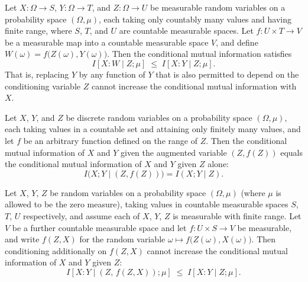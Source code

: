 \begin{theorem}
\label{ProbabilityTheory.condMutualInfo_comp_right_le_of_comp_conditioning}
\leanok
{}
Let $X\colon\Omega\to S$, $Y\colon\Omega\to T$, and $Z\colon\Omega\to U$ be measurable
random variables on a probability space $(\Omega,\mu)$, each taking only countably many
values and having finite range, where $S$, $T$, and $U$ are countable measurable spaces.
Let $f\colon U\times T\to V$ be a measurable map into a countable measurable space $V$,
and define $W(\omega)=f\big(Z(\omega),Y(\omega)\big)$. Then the conditional mutual
information satisfies
\[
  I[X : W \mid Z;\mu] \;\le\; I[X : Y \mid Z;\mu].
\]
That is, replacing $Y$ by any function of $Y$ that is also permitted to depend on the
conditioning variable $Z$ cannot increase the conditional mutual information with $X$.
\end{theorem}

\begin{theorem}
\label{ProbabilityTheory.condMutualInfo_conditioning_prod_function_eq}
\leanok
{}
Let $X$, $Y$, and $Z$ be discrete random variables on a probability space $(\Omega,
\mu)$, each taking values in a countable set and attaining only finitely many values,
and let $f$ be an arbitrary function defined on the range of $Z$. Then the conditional
mutual information of $X$ and $Y$ given the augmented variable $(Z, f(Z))$ equals the
conditional mutual information of $X$ and $Y$ given $Z$ alone:
\[
  I\bigl(X ; Y \mid (Z, f(Z))\bigr) = I(X ; Y \mid Z).
\]
\end{theorem}

\begin{theorem}
\label{ProbabilityTheory.condMutualInfo_conditioning_prod_left_function_le}
\leanok
{}
Let $X$, $Y$, $Z$ be random variables on a probability space $(\Omega,\mu)$ (where $\mu$
is allowed to be the zero measure), taking values in countable measurable spaces $S$,
$T$, $U$ respectively, and assume each of $X$, $Y$, $Z$ is measurable with finite range.
Let $V$ be a further countable measurable space and let $f\colon U\times S\to V$ be
measurable, and write $f(Z,X)$ for the random variable $\omega\mapsto
f\bigl(Z(\omega),X(\omega)\bigr)$. Then conditioning additionally on $f(Z,X)$ cannot
increase the conditional mutual information of $X$ and $Y$ given $Z$:
\[
  I[X : Y \mid (Z,\, f(Z,X)) ; \mu]
  \;\le\;
  I[X : Y \mid Z ; \mu].
\]
\end{theorem}

